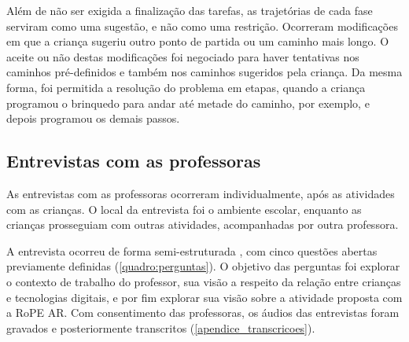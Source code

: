 Além de não ser exigida a finalização das tarefas, as trajetórias de cada fase serviram como uma sugestão, e não como uma restrição. Ocorreram modificações em que a criança sugeriu outro ponto de partida ou um caminho mais longo. O aceite ou não destas modificações foi negociado para haver tentativas nos caminhos pré-definidos e também nos caminhos sugeridos pela criança. Da mesma forma, foi permitida a resolução do problema em etapas, quando a criança programou o brinquedo para andar até metade do caminho, por exemplo, e depois programou os demais passos.

\newpage

\subsection{Entrevistas com as professoras}
As entrevistas com as professoras ocorreram individualmente, após as atividades com as crianças. O local da entrevista foi o ambiente escolar, enquanto as crianças prosseguiam com outras atividades, acompanhadas por outra professora. 

A entrevista ocorreu de forma semi-estruturada \cite{boni_aprendendo_entrevistar_2005}, com cinco questões abertas previamente definidas (\autoref{quadro:perguntas}). O objetivo das perguntas foi explorar o contexto de trabalho do professor, sua visão a respeito da relação entre crianças e tecnologias digitais, e por fim explorar sua visão sobre a atividade proposta com a RoPE AR. Com consentimento das professoras, os áudios das entrevistas foram gravados e posteriormente transcritos (\autoref{apendice_transcricoes}).


